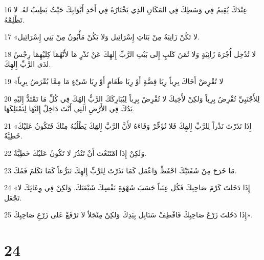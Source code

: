 \par 16 عِنْدَكَ يُقِيمُ فِي وَسَطِكَ فِي المَكَانِ الذِي يَخْتَارُهُ فِي أَحَدِ أَبْوَابِكَ حَيْثُ يَطِيبُ لهُ. لا تَظْلِمْهُ.
\par 17 «لا تَكُنْ زَانِيَةٌ مِنْ بَنَاتِ إِسْرَائِيل وَلا يَكُنْ مَأْبُونٌ مِنْ بَنِي إِسْرَائِيل.
\par 18 لا تُدْخِل أُجْرَةَ زَانِيَةٍ وَلا ثَمَنَ كَلبٍ إِلى بَيْتِ الرَّبِّ إِلهِكَ عَنْ نَذْرٍ مَا لأَنَّهُمَا كِليْهِمَا رِجْسٌ لدَى الرَّبِّ إِلهِكَ.
\par 19 «لا تُقْرِضْ أَخَاكَ بِرِباً رِبَا فِضَّةٍ أَوْ رِبَا طَعَامٍ أَوْ رِبَا شَيْءٍ مَا مِمَّا يُقْرَضُ بِرِباً
\par 20 لِلأَجْنَبِيِّ تُقْرِضُ بِرِباً وَلكِنْ لأَخِيكَ لا تُقْرِضْ بِرِباً لِيُبَارِكَكَ الرَّبُّ إِلهُكَ فِي كُلِّ مَا تَمْتَدُّ إِليْهِ يَدُكَ فِي الأَرْضِ التِي أَنْتَ دَاخِلٌ إِليْهَا لِتَمْتَلِكَهَا.
\par 21 «إِذَا نَذَرْتَ نَذْراً لِلرَّبِّ إِلهِكَ فَلا تُؤَخِّرْ وَفَاءَهُ لأَنَّ الرَّبَّ إِلهَكَ يَطْلُبُهُ مِنْكَ فَتَكُونُ عَليْكَ خَطِيَّةٌ.
\par 22 وَلكِنْ إِذَا امْتَنَعْتَ أَنْ تَنْذُرَ لا تَكُونُ عَليْكَ خَطِيَّةٌ.
\par 23 مَا خَرَجَ مِنْ شَفَتَيْكَ احْفَظْ وَاعْمَل كَمَا نَذَرْتَ لِلرَّبِّ إِلهِكَ تَبَرُّعاً كَمَا تَكَلمَ فَمُكَ.
\par 24 «إِذَا دَخَلتَ كَرْمَ صَاحِبِكَ فَكُل عِنَباً حَسَبَ شَهْوَةِ نَفْسِكَ شَبْعَتَكَ. وَلكِنْ فِي وِعَائِكَ لا تَجْعَل.
\par 25 إِذَا دَخَلتَ زَرْعَ صَاحِبِكَ فَاقْطِفْ سَنَابِل بِيَدِكَ وَلكِنْ مِنْجَلاً لا تَرْفَعْ عَلى زَرْعِ صَاحِبِكَ».

\chapter{24}

